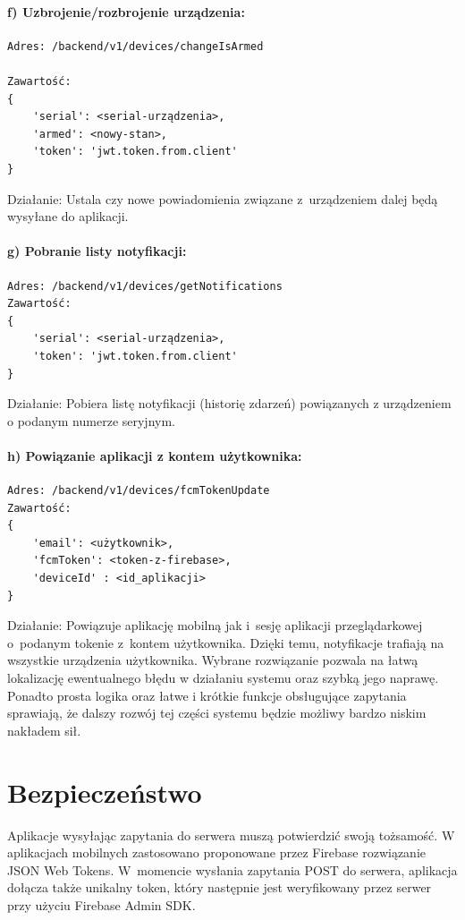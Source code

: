 \paragraph{f) Uzbrojenie/rozbrojenie urządzenia:}
\begin{verbatim}
Adres: /backend/v1/devices/changeIsArmed

Zawartość: 
{
	'serial': <serial-urządzenia>, 
	'armed': <nowy-stan>, 
	'token': 'jwt.token.from.client'
}
\end{verbatim}
Działanie: Ustala czy nowe powiadomienia związane z~urządzeniem dalej będą wysyłane do aplikacji.
\paragraph{g) Pobranie listy notyfikacji:}
\begin{verbatim}
Adres: /backend/v1/devices/getNotifications
Zawartość: 
{
	'serial': <serial-urządzenia>,  
	'token': 'jwt.token.from.client'
}
\end{verbatim}
Działanie: Pobiera listę notyfikacji (historię zdarzeń) powiązanych z urządzeniem o podanym numerze seryjnym.
\paragraph{h) Powiązanie aplikacji z kontem użytkownika:}
\begin{verbatim}
Adres: /backend/v1/devices/fcmTokenUpdate
Zawartość: 
{
	'email': <użytkownik>, 
	'fcmToken': <token-z-firebase>, 
	'deviceId' : <id_aplikacji>
}
\end{verbatim}
Działanie: Powiązuje aplikację mobilną jak i~sesję aplikacji przeglądarkowej o~podanym tokenie z~kontem użytkownika. Dzięki temu, notyfikacje trafiają na wszystkie urządzenia użytkownika.
\newline
\newline
Wybrane rozwiązanie pozwala na łatwą lokalizację ewentualnego błędu w działaniu systemu oraz szybką jego naprawę. Ponadto prosta logika oraz łatwe i krótkie funkcje obsługujące zapytania sprawiają, że dalszy rozwój tej części systemu będzie możliwy bardzo niskim nakładem sił. 

\section{Bezpieczeństwo}

Aplikacje wysyłając zapytania do serwera muszą potwierdzić swoją tożsamość. 
W aplikacjach mobilnych zastosowano proponowane przez Firebase rozwiązanie JSON Web Tokens. W~momencie wysłania zapytania POST do serwera, aplikacja dołącza także unikalny token, który następnie jest weryfikowany przez serwer przy użyciu Firebase Admin SDK.

